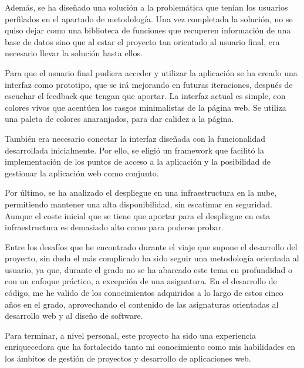 Además, se ha diseñado una solución a la problemática que tenían los usuarios perfilados en el apartado de metodología. Una vez completada la solución, no se quiso dejar como una biblioteca de funciones que recuperen información de una base de datos sino que al estar el proyecto tan orientado al usuario final, era necesario llevar la solución hasta ellos.

Para que el usuario final pudiera acceder y utilizar la aplicación se ha creado una interfaz como prototipo, que se irá mejorando en futuras iteraciones, después de escuchar el feedback que tengan que aportar. La interfaz actual es simple, con colores vivos que acentúen los rasgos minimalistas de la página web. Se utiliza una paleta de colores anaranjados, para dar calidez a la página. 

También era necesario conectar la \gls{interfaz} diseñada con la funcionalidad desarrollada inicialmente. Por ello, se eligió un \gls{framework} que facilitó la implementación de los puntos de acceso a la aplicación y la posibilidad de gestionar la aplicación web como conjunto. 

Por último, se ha analizado el despliegue en una infraestructura en la nube, permitiendo mantener una alta disponibilidad, sin escatimar en seguridad. Aunque el coste inicial que se tiene que aportar para el despliegue en esta infraestructura es demasiado alto como para poderse probar. 

Entre los desafíos que he encontrado durante el viaje que supone el desarrollo del proyecto, sin duda el más complicado ha sido seguir una metodología orientada al usuario, ya que, durante el grado no se ha abarcado este tema en profundidad o con un enfoque práctico, a excepción de una asignatura. En el desarrollo de código, me he valido de los conocimientos adquiridos a lo largo de estos cinco años en el grado, aprovechando el contenido de las asignaturas orientadas al desarrollo web y al diseño de software.

Para terminar, a nivel personal, este proyecto ha sido una experiencia enriquecedora que ha fortalecido tanto mi conocimiento como mis habilidades en los ámbitos de gestión de proyectos y desarrollo de aplicaciones web. 